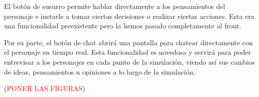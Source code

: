 El botón de susurro permite hablar directamente a los pensamientos del personaje e instarle a tomar ciertas decisiones o realizar ciertas acciones. Esta era una funcionalidad preexistente pero la hemos pasado completamente al front.

Por su parte, el botón de chat abrirá una pantalla para chatear directamente con el personaje en tiempo real. Esta funcionalidad es novedosa y servirá para poder entrevisar a los personajes en cada punto de la simulación, viendo así sus cambios de ideas, pensamientos u opiniones a lo largo de la simulación.

(\textcolor{red}{PONER LAS FIGURAS})


